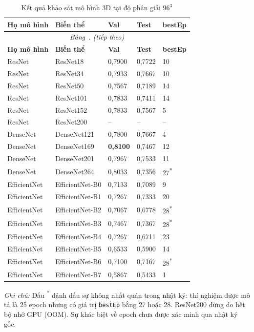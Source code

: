 \documentclass[14pt,a4paper,oneside]{extreport}
\renewcommand{\thetable}{\thechapter.\arabic{table}}
\begin{document}
\begin{longtable}{@{}p{}p{}p{}p{}p{}@{}}
  \caption{Kết quả khảo sát mô hình 3D tại độ phân giải $96^3$}
  \label{tab:sweep-accuracy}\\
  \toprule
  \textbf{Họ mô hình} & \textbf{Biến thể} & \textbf{Val} & \textbf{Test} & \textbf{bestEp}\\
  \midrule
  \endfirsthead
  \multicolumn{5}{c}{\textit{Bảng~\thetable{} (tiếp theo)}}\\
  \toprule
  \textbf{Họ mô hình} & \textbf{Biến thể} & \textbf{Val} & \textbf{Test} & \textbf{bestEp}\\
  \midrule
  \endhead
  \bottomrule
  \endfoot
  ResNet & ResNet18 & 0,7900 & 0,7722 & 10\\
  ResNet & ResNet34 & 0,7933 & 0,7667 & 10\\
  ResNet & ResNet50 & 0,7567 & 0,7189 & 14\\
  ResNet & ResNet101 & 0,7833 & 0,7411 & 14\\
  ResNet & ResNet152 & 0,7833 & 0,7567 & 5\\
  ResNet & ResNet200 & -- & -- & --\\
  \midrule
  DenseNet & DenseNet121 & 0,7800 & 0,7667 & 4\\
  DenseNet & DenseNet169 & \textbf{0,8100} & 0,7467 & 12\\
  DenseNet & DenseNet201 & 0,7967 & 0,7533 & 11\\
  DenseNet & DenseNet264 & 0,8033 & 0,7356 & 27\textsuperscript{*}\\
  \midrule
  EfficientNet & EfficientNet-B0 & 0,7133 & 0,7089 & 9\\
  EfficientNet & EfficientNet-B1 & 0,7267 & 0,7333 & 20\\
  EfficientNet & EfficientNet-B2 & 0,7067 & 0,6778 & 28\textsuperscript{*}\\
  EfficientNet & EfficientNet-B3 & 0,7467 & 0,7367 & 28\textsuperscript{*}\\
  EfficientNet & EfficientNet-B4 & 0,7267 & 0,6711 & 23\\
  EfficientNet & EfficientNet-B5 & 0,6533 & 0,5900 & 14\\
  EfficientNet & EfficientNet-B6 & 0,7100 & 0,7167 & 28\textsuperscript{*}\\
  EfficientNet & EfficientNet-B7 & 0,5867 & 0,5433 & 1\\
\end{longtable}

\noindent\textit{Ghi chú:} Dấu \textsuperscript{*} đánh dấu sự không nhất quán
trong nhật ký: thí nghiệm được mô tả là 25 epoch nhưng có giá trị
\texttt{bestEp} bằng 27 hoặc 28. ResNet200 dừng do hết bộ nhớ GPU (OOM).
Sự khác biệt về epoch chưa được xác minh qua nhật ký gốc.
\end{document}
